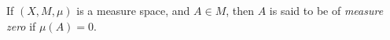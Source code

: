 \documentclass[12pt]{article}
\begin{document}
If $(X,M,\mu)$ is a measure space, and $A \in M$, then $A$ is said to be of {\em measure zero} if $\mu(A)=0$.
\end{document}

